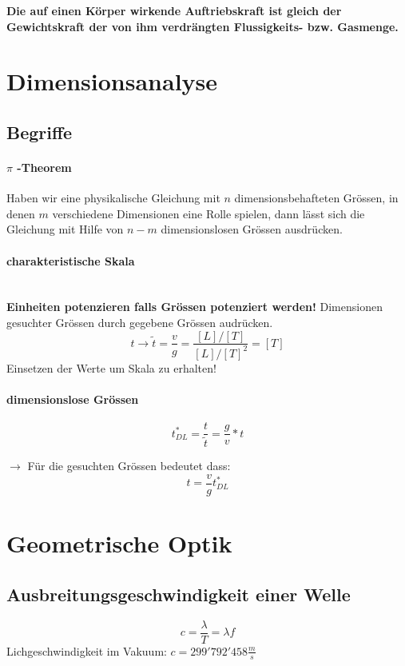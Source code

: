 \documentclass{article}
\begin{document}
\begin{multicols*}{3}
  \textbf{Die auf einen Körper wirkende Auftriebskraft ist gleich der Gewichtskraft der von ihm
  verdrängten Flussigkeits- bzw. Gasmenge.}

  \section{Dimensionsanalyse}

  \subsection{Begriffe}

  \paragraph{$\pi$ -Theorem}
  Haben wir eine physikalische Gleichung mit $n$ dimensionsbehafteten Grössen, in denen $m$
  verschiedene Dimensionen eine Rolle spielen, dann lässt sich die Gleichung mit Hilfe von
  $n - m$ dimensionslosen Grössen ausdrücken.

  \paragraph{charakteristische Skala}\\
  \textbf{Einheiten potenzieren falls Grössen potenziert werden!}
  Dimensionen gesuchter Grössen durch gegebene Grössen audrücken.\\
  $$t \rightarrow \widetilde{t} = \frac{v}{g} = \frac{[L]/[T]}{[L]/[T]^2} = [T]$$
  Einsetzen der Werte um Skala zu erhalten!

  \paragraph{dimensionslose Grössen}

  $$t^*_{DL}= \frac{t}{\widetilde{t}} = \frac{g}{v}*t$$

  $\rightarrow$ Für die gesuchten Grössen bedeutet dass: $$t = \frac{v}{g}t^*_{DL}$$

  \section{Geometrische Optik}
  \subsection{Ausbreitungsgeschwindigkeit einer Welle}
  $$c=\frac{\lambda}{T} = \lambda f$$
  Lichgeschwindigkeit im Vakuum: $c = 299'792'458 \frac{m}{s}$


\end{multicols*}
\end{document}
